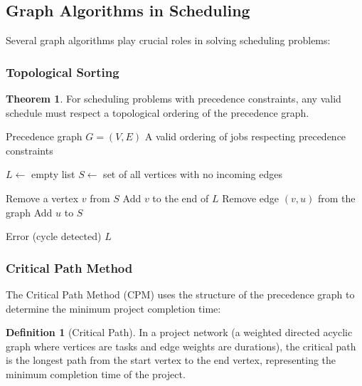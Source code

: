 \documentclass{article}
\theoremstyle{definition}
\newtheorem{theorem}{Theorem}
\newtheorem{definition}{Definition}
\begin{document}
\subsection*{Graph Algorithms in Scheduling}

Several graph algorithms play crucial roles in solving scheduling problems:

\subsubsection*{Topological Sorting}

\begin{theorem}
For scheduling problems with precedence constraints, any valid schedule must respect a topological ordering of the precedence graph.
\end{theorem}

\begin{algorithm}
\caption{Topological Sort for Precedence-Constrained Scheduling}
\label{alg:topo-sort}
\begin{algorithmic}[1]
    \Require Precedence graph $G = (V, E)$
    \Ensure A valid ordering of jobs respecting precedence constraints
    
    \State $L \gets$ empty list
    \State $S \gets$ set of all vertices with no incoming edges
    
        \State Remove a vertex $v$ from $S$
        \State Add $v$ to the end of $L$
            \State Remove edge $(v, u)$ from the graph
                \State Add $u$ to $S$
            \EndIf
        \EndFor
    \EndWhile
    
        \State \Return Error (cycle detected)
    \Else
        \State \Return $L$
    \EndIf
\end{algorithmic}
\end{algorithm}

\subsubsection*{Critical Path Method}

The Critical Path Method (CPM) uses the structure of the precedence graph to determine the minimum project completion time:

\begin{definition}[Critical Path]
In a project network (a weighted directed acyclic graph where vertices are tasks and edge weights are durations), the critical path is the longest path from the start vertex to the end vertex, representing the minimum completion time of the project.
\end{definition}
\end{document}
